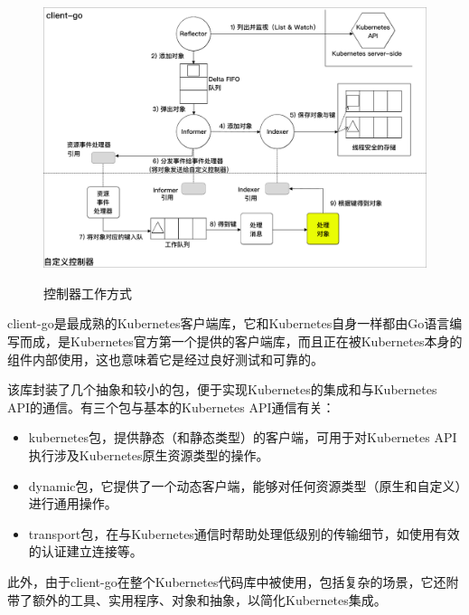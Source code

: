 \documentclass[macfonts,master]{njuthesis}
\begin{document}
\begin{figure}[htbp]
  \centering
  \includegraphics[width= 1\textwidth]{pics/client-go-controller-interaction.pdf}\\
  \caption{控制器工作方式}\label{fig:client-go-controller-interaction}
\end{figure}

client-go是最成熟的Kubernetes客户端库，它和Kubernetes自身一样都由Go语言编写而成，是Kubernetes官方第一个提供的客户端库，而且正在被Kubernetes本身的组件内部使用，这也意味着它是经过良好测试和可靠的\cite{controllerclientgo}。

该库封装了几个抽象和较小的包，便于实现Kubernetes的集成和与Kubernetes API的通信。有三个包与基本的Kubernetes API通信有关\cite{controllerclientgo}：

\begin{itemize}
	\item kubernetes包，提供静态（和静态类型）的客户端，可用于对Kubernetes API执行涉及Kubernetes原生资源类型的操作。
	\item dynamic包，它提供了一个动态客户端，能够对任何资源类型（原生和自定义）进行通用操作。
	\item transport包，在与Kubernetes通信时帮助处理低级别的传输细节，如使用有效的认证建立连接等。
\end{itemize}

此外，由于client-go在整个Kubernetes代码库中被使用，包括复杂的场景，它还附带了额外的工具、实用程序、对象和抽象，以简化Kubernetes集成。
\end{document}

